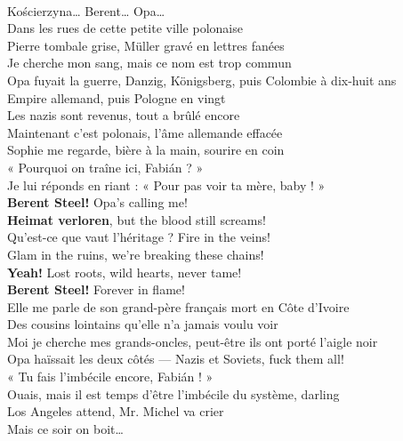 \begin{lyrics}

\\
Kościerzyna… Berent… Opa…\\

Dans les rues de cette petite ville polonaise\\
Pierre tombale grise, Müller gravé en lettres fanées\\
Je cherche mon sang, mais ce nom est trop commun\\
Opa fuyait la guerre, Danzig, Königsberg, puis Colombie à dix-huit ans\\

Empire allemand, puis Pologne en vingt\\
Les nazis sont revenus, tout a brûlé encore\\
Maintenant c’est polonais, l’âme allemande effacée\\

Sophie me regarde, bière à la main, sourire en coin\\
« Pourquoi on traîne ici, Fabián ? »\\
Je lui réponds en riant : « Pour pas voir ta mère, baby ! »\\

\textbf{Berent Steel!} Opa’s calling me!\\
\textbf{Heimat verloren}, but the blood still screams!\\
Qu’est-ce que vaut l’héritage ? Fire in the veins!\\
Glam in the ruins, we’re breaking these chains!\\
\textbf{Yeah!} Lost roots, wild hearts, never tame!\\
\textbf{Berent Steel!} Forever in flame!\\

Elle me parle de son grand-père français mort en Côte d’Ivoire\\
Des cousins lointains qu’elle n’a jamais voulu voir\\
Moi je cherche mes grands-oncles, peut-être ils ont porté l’aigle noir\\
Opa haïssait les deux côtés — Nazis et Soviets, fuck them all!\\

« Tu fais l’imbécile encore, Fabián ! »\\
Ouais, mais il est temps d’être l’imbécile du système, darling\\
Los Angeles attend, Mr. %
Michel va crier\\
Mais ce soir on boit…\\


\end{lyrics}
